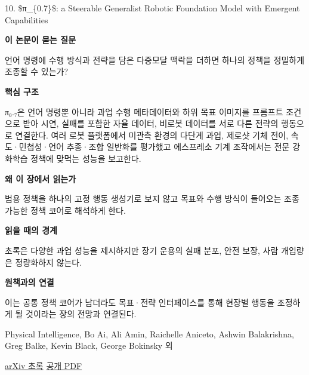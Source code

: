 \documentclass[11pt,openany]{book}
\begin{document}
\begin{termcard}{10. \$π\_\{0.7\}\$: a Steerable Generalist Robotic Foundation Model with Emergent Capabilities}

\par

\medskip

{\sffamily\bfseries\color{deepblue} 이 논문이 묻는 질문}\par

언어 명령에 수행 방식과 전략을 담은 다중모달 맥락을 더하면 하나의 정책을 정밀하게 조종할 수 있는가?

\smallskip

{\sffamily\bfseries\color{deepblue} 핵심 구조}\par

π₀.₇은 언어 명령뿐 아니라 과업 수행 메타데이터와 하위 목표 이미지를 프롬프트 조건으로 받아 시연, 실패를 포함한 자율 데이터, 비로봇 데이터를 서로 다른 전략의 행동으로 연결한다. 여러 로봇 플랫폼에서 미관측 환경의 다단계 과업, 제로샷 기체 전이, 속도·민첩성·언어 추종·조합 일반화를 평가했고 에스프레소 기계 조작에서는 전문 강화학습 정책에 맞먹는 성능을 보고한다.

\smallskip

{\sffamily\bfseries\color{deepblue} 왜 이 장에서 읽는가}\par

범용 정책을 하나의 고정 행동 생성기로 보지 않고 목표와 수행 방식이 들어오는 조종 가능한 정책 코어로 해석하게 한다.

\smallskip

{\sffamily\bfseries\color{coral} 읽을 때의 경계}\par

초록은 다양한 과업 성능을 제시하지만 장기 운용의 실패 분포, 안전 보장, 사람 개입량은 정량화하지 않는다.

\smallskip

{\sffamily\bfseries\color{teal} 원책과의 연결}\par

이는 공통 정책 코어가 남더라도 목표·전략 인터페이스를 통해 현장별 행동을 조정하게 될 것이라는 장의 전망과 연결된다.

\medskip

{\footnotesize\color{muted} Physical Intelligence, Bo Ai, Ali Amin, Raichelle Aniceto, Ashwin Balakrishna, Greg Balke, Kevin Black, George Bokinsky 외\par

\href{https://arxiv.org/abs/2604.15483}{arXiv 초록} \quad \href{https://arxiv.org/pdf/2604.15483}{공개 PDF}\par}

\end{termcard}
\end{document}
